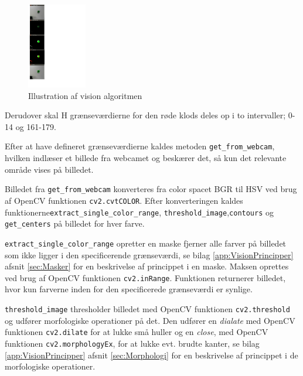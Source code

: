 \begin{figure}
  \begin{center}
    \includegraphics[width=0.23\textwidth]{figurer/ImagesFromVision}
  \end{center}
  \caption{Illustration af vision algoritmen}\label{fig:ImagesFromVision}
\end{figure}

Derudover skal H grænseværdierne for den røde klods deles op i to intervaller; 0-14 og 161-179.

Efter at have defineret grænseværdierne kaldes metoden \texttt{get\_from\_webcam}, hvilken indlæser et billede fra webcamet og beskærer det, så kun det relevante område vises på billedet.

Billedet fra \texttt{get\_from\_webcam} konverteres fra color spacet BGR til HSV ved brug af OpenCV funktionen \texttt{cv2.cvtCOLOR}.
Efter konverteringen kaldes funktionerne\newline \texttt{extract\_single\_color\_range}, \texttt{threshold\_image},\newline \texttt{contours} og \texttt{get\_centers} på billedet for hver farve.

\texttt{extract\_single\_color\_range} opretter en maske fjerner alle farver på billedet som ikke ligger i den specificerende grænseværdi, se bilag \ref{app:VisionPrincipper} afsnit \vref{sec:Masker} for en beskrivelse af princippet i en maske.
Maksen oprettes ved brug af OpenCV funktionen \texttt{cv2.inRange}.
Funktionen returnerer billedet, hvor kun farverne inden for den specificerede grænseværdi er synlige.

\texttt{threshold\_image} thresholder billedet med OpenCV funktionen \texttt{cv2.threshold} og udfører morfologiske operationer på det.
Den udfører en \textit{dialate} med OpenCV funktionen \texttt{cv2.dilate} for at lukke små huller og en \textit{close}, med OpenCV funktionen \texttt{cv2.morphologyEx}, for at lukke evt. brudte kanter, se bilag \ref{app:VisionPrincipper} afsnit \vref{sec:Morphologi} for en beskrivelse af princippet i de morfologiske operationer.

